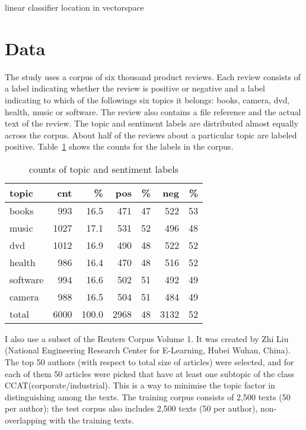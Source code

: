 \documentclass[11pt]{article}
\begin{document}
linear classifier location in vectorspace

\section{Data}

The study uses a corpus of six thousand product reviews. Each review consists of a label indicating whether the review is positive or negative and a label indicating to which of the followings six topics it belongs: books, camera, dvd, health, music or software. The review also contains a file reference and the actual text of the review. The topic and sentiment labels are distributed almost equally across the corpus. About half of the reviews about a particular topic are labeled positive. Table~\ref{tab:corpus} shows the counts for the labels in the corpus.

\begin{table}[ht]\footnotesize
\caption{counts of topic and sentiment labels}
\label{tab:corpus}
\begin{tabular}{ l r r r r r r }
topic & cnt & \% & pos & \% & neg & \% \\
\hline
books & 993 & 16.5 & 471 & 47 & 522 & 53 \\
music & 1027 & 17.1 & 531 & 52 & 496 & 48 \\
dvd & 1012 & 16.9 & 490 & 48 & 522 & 52 \\
health & 986 & 16.4 & 470 & 48 & 516 & 52 \\
software & 994 & 16.6 & 502 & 51 & 492 & 49 \\
camera & 988 & 16.5 & 504 & 51 & 484 & 49 \\
\hline
total & 6000 & 100.0 & 2968 & 48 & 3132 & 52 \\
\end{tabular}

\end{table}

I also use a subset of the Reuters Corpus Volume 1. It was created by Zhi Liu (National Engineering Research Center for E-Learning, Hubei Wuhan, China). The top 50 authors (with respect to total size of articles) were selected, and for each of them 50 articles were picked that have at least one subtopic of the class CCAT(corporate/industrial). This is a way to minimise the topic factor in distinguishing among the texts. The training corpus consists of 2,500 texts (50 per author); the test corpus also includes 2,500 texts (50 per author), non-overlapping with the training texts.
\end{document}
